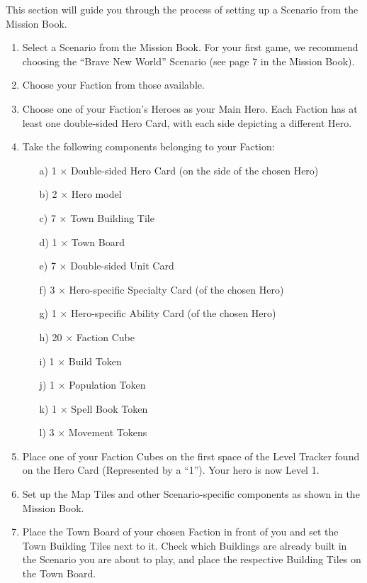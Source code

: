 \begin{multicols*}{2}

This section will guide you through the process of setting up a Scenario from the Mission Book.

\begin{enumerate}
  \item Select a Scenario from the Mission Book.
    For your first game, we recommend choosing the ``Brave New World'' Scenario (see page 7 in the Mission Book).
  \item Choose your Faction from those available.
  \item Choose one of your Faction's Heroes as your Main Hero.
    Each Faction has at least one double-sided Hero Card, with each side depicting a different Hero.
  \item Take the following components belonging to your Faction:
  \begin{itemize}
    \item[a)]1 × Double-sided Hero Card (on the side of the chosen Hero)
    \item[b)]2 × Hero model
    \item[c)]7 × Town Building Tile
    \item[d)]1 × Town Board
    \item[e)]7 × Double-sided Unit Card
    \item[f)]3 × Hero-specific Specialty Card (of the chosen Hero)
    \item[g)]1 × Hero-specific Ability Card (of the chosen Hero)
    \item[h)]20 × Faction Cube
    \item[i)]1 × Build Token
    \item[j)]1 × Population Token
    \item[k)]1 × Spell Book Token
    \item[l)]3 × Movement Tokens
  \end{itemize}
  \item Place one of your Faction Cubes on the first space of the Level Tracker found on the Hero Card (Represented by a ``1'').
    Your hero is now Level 1.
  \item Set up the Map Tiles and other Scenario-specific components as shown in the Mission Book.
  \item Place the Town Board of your chosen Faction in front of you and set the Town Building Tiles next to it.
    Check which Buildings are already built in the Scenario you are about to play, and place the respective Building Tiles on the Town Board.

\end{enumerate}
\end{multicols*}

